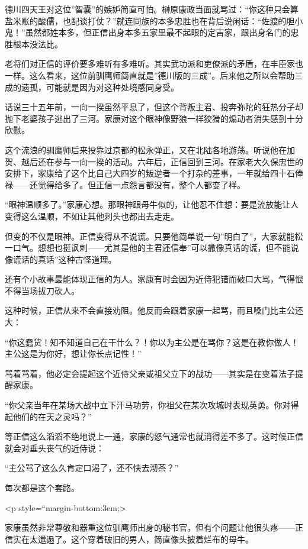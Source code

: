 \documentclass[
]{book}
\begin{document}
德川四天王对这位''智囊''的嫉妒简直可怕。榊原康政当面就骂过：``你这种只会算盐米账的酸儒，也配谈打仗？''就连同族的本多忠胜也在背后说闲话：``佐渡的胆小鬼！''虽然都姓本多，但正信出身本多五家里最不起眼的定吉家，跟出身名门的忠胜根本没法比。

老将们对正信的评价要多难听有多难听。其实武功派和吏僚派的矛盾，在丰臣家也一样。这么看来，这位前驯鹰师简直就是''德川版的三成''。后来他之所以会帮助三成的遗孤，可能就是因为对这种处境感同身受。

话说三十五年前，一向一揆虽然平息了，但这个背叛主君、投奔弥陀的狂热分子却抛下老婆孩子逃出了三河。家康对这个眼神像野狼一样狡猾的煽动者消失感到十分欣慰。

这个流浪的驯鹰师后来投靠过京都的松永弹正，又在北陆各地游荡。听说他在加贺、越后还在参与一向一揆的活动。六年后，正信回到三河。在家老大久保忠世的安排下，家康给了这个比自己大四岁的叛逆者一个打杂的差事，一年就给四十石俸禄------还觉得给多了。但正信一点怨言都没有，整个人都变了样。

``眼神温顺多了。''家康心想。那眼神跟母牛似的，让他忍不住想：要是流放能让人变得这么温顺，不如让其他刺头也都出去走走。

但变的不仅是眼神。正信变得从不说谎。只要他简单说一句''明白了''，大家就能松一口气。想想也挺讽刺------尤其是他的主君还信奉''可以撒像真话的谎，但不能说像谎话的真话''这种古怪道理。

还有个小故事最能体现正信的为人。家康有时会因为近侍犯错而破口大骂，气得恨不得当场拔刀砍人。

这种时候，正信从来不会直接劝阻。他反而会跟着家康一起骂，而且嗓门比主公还大：

``你这蠢货！知不知道自己在干什么？！你以为主公是在骂你？这是在教你做人！主公这是为你好，想让你长点记性！''

骂着骂着，他必定会提起这个近侍父亲或祖父立下的战功------其实是在变着法子提醒家康。

``你父亲当年在某场大战中立下汗马功劳，你祖父在某次攻城时表现英勇。你对得起他们的在天之灵吗？''

等正信这么滔滔不绝地说上一通，家康的怒气通常也就消得差不多了。这时候正信就会对垂头丧气的近侍说：

``主公骂了这么久肯定口渴了，还不快去沏茶？''

每次都是这个套路。

\textless p style=``margin-bottom:3em;\textgreater{}

家康虽然非常尊敬和器重这位驯鹰师出身的秘书官，但有个问题让他很头疼------正信实在太邋遢了。这个穿着破旧的男人，简直像头披着烂布的母牛。
\end{document}
